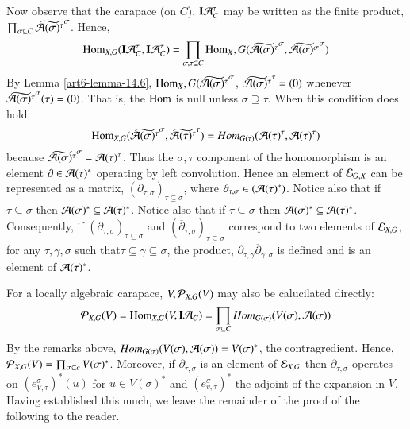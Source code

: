 Now observe that the carapace (on $C$), $\mathbf{I}\mathcal{A}_{C}^{\tau}$ may be written as the finite product, $\prod_{\sigma \subseteq C}\widetilde{\mathcal{A}(\sigma)^{\tau}}^{\sigma}$. Hence,
\begin{equation}\label{art6-eq-15.1}
\operatorname{Hom}_{X, G}(\mathbf{I} \mathcal{A}_{C}^{\tau}, \mathbf{I}\mathcal{A}_{C}^{\tau}) = \prod_{\sigma, \tau \subseteq C}\operatorname{Hom}_{X}, G(\widetilde{\mathcal{A}(\sigma)^{\tau}}^{\sigma}, \widetilde{\mathcal{A}(\sigma)^{\sigma}}^{\sigma})
\end{equation}
By Lemma \ref{art6-lemma-14.6}, $\operatorname{Hom}_{X}, G(\widetilde{\mathcal{A}(\sigma)^\tau}^{\sigma}$, $\widetilde{\mathcal{A}(\sigma)^\tau}^{\tau} = (0)$ whenever $\widetilde{\mathcal{A}(\sigma)^{\tau}}^{\sigma}(\tau)= (0)$. That is, the $\operatorname{Hom}$ is null unless $\sigma \supseteq \tau$. When this condition does hold:
$$
\operatorname{Hom}_{X, G}(\widetilde{\mathcal{A}(\sigma)^{\tau}}^{\sigma}, \widetilde{\mathcal{A}(\tau)^\tau}^{\tau}) = Hom_{G(\tau)}(\mathcal{A}(\tau)^{\tau}, \mathcal{A}(\tau)^{\tau})
$$
because $\widetilde{\mathcal{A}(\sigma)^{\tau}}^{\sigma} = \mathcal{A}(\tau)^{\tau}$. Thus the $\sigma, \tau$ component of the homomorphism is an element $\partial \in \mathcal{A}(\tau)^{*}$ operating by left convolution. Hence an element of $\mathcal{E}_{G, X}$ can be represented as a matrix, $(\partial_{\tau, \sigma})_{\tau \subseteq \sigma}$, where $\partial_{\tau, \sigma} \in (\mathcal{A}(\tau)^{*})$. Notice also that if $\tau \subseteq \sigma$ then $\mathcal{A}(\sigma)^{*} \subseteq \mathcal{A}(\tau)^{*}$. Notice also that if $\tau \subseteq \sigma$ then $\mathcal{A}(\sigma)^{*} \subseteq \mathcal{A}(\tau)^{*}$. Consequently, if $(\partial_{\tau, \sigma})_{\tau \subseteq \sigma}$ and $(\overline{\partial}_{\tau, \sigma})_{\tau \subseteq \sigma}$ correspond to two elements of $\mathcal{E}_{X, G}$, for any $\tau, \gamma, \sigma$ such that$\tau \subseteq \gamma \subseteq \sigma$, the product, $\partial_{\tau, \gamma}\overline{\partial}_{\gamma, \sigma}$ is defined and is an element of $\mathcal{A}(\tau)^{*}$.

For a locally algebraic carapace, $V, \mathcal{P}_{X, G}(V)$ may also be calucilated directly: 
$$
\mathcal{P}_{X, G}(V)=  \operatorname{Hom}_{X, G}(V, \mathbf{I} \mathcal{A}_{C}) = \prod_{\sigma \subseteq C}Hom_{G(\sigma)}(V(\sigma), \mathcal{A}(\sigma))
$$
By the remarks above, $Hom_{G(\sigma)}(V(\sigma), \mathcal{A}(\sigma))= V(\sigma)^{*}$, the contragredient. Hence, $\mathcal{P}_{X, G}(V) = \prod_{\sigma \subseteq c}V(\sigma)^{*}$. Moreover, if $\partial_{\tau, \sigma}$ is an element of $\mathcal{E}_{X, G}$ then $\partial_{\tau, \sigma}$ operates on $\left(e_{V, \tau}^{\sigma}\right)^{*}(u)$ for $u \in V(\sigma)^{*}$ and $(e_{v, \tau}^{\sigma})^{*}$ the adjoint of the expansion in $V$. Having established this much, we leave the remainder of the proof of the following to the reader.

